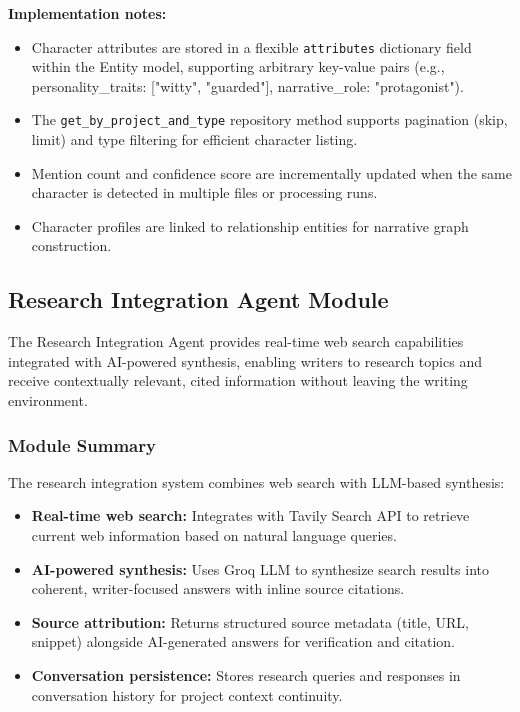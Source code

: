 \textbf{Implementation notes:}
\begin{itemize}
    \item Character attributes are stored in a flexible \texttt{attributes} dictionary field within the Entity model, supporting arbitrary key-value pairs (e.g., personality\_traits: ["witty", "guarded"], narrative\_role: "protagonist").
    \item The \texttt{get\_by\_project\_and\_type} repository method supports pagination (skip, limit) and type filtering for efficient character listing.
    \item Mention count and confidence score are incrementally updated when the same character is detected in multiple files or processing runs.
    \item Character profiles are linked to relationship entities for narrative graph construction.
\end{itemize}

\subsection{Research Integration Agent Module}
\label{subsec:research-integration}

The Research Integration Agent provides real-time web search capabilities integrated with AI-powered synthesis, enabling writers to research topics and receive contextually relevant, cited information without leaving the writing environment.

\subsubsection{Module Summary}

The research integration system combines web search with LLM-based synthesis:

\begin{itemize}
    \item \textbf{Real-time web search:} Integrates with Tavily Search API to retrieve current web information based on natural language queries.
    \item \textbf{AI-powered synthesis:} Uses Groq LLM to synthesize search results into coherent, writer-focused answers with inline source citations.
    \item \textbf{Source attribution:} Returns structured source metadata (title, URL, snippet) alongside AI-generated answers for verification and citation.
    \item \textbf{Conversation persistence:} Stores research queries and responses in conversation history for project context continuity.
\end{itemize}


